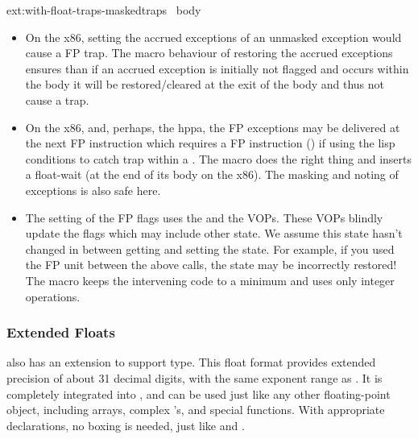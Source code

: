 \begin{defmac}{ext:}{with-float-traps-masked}{traps \ampbody\ body}
\begin{itemize}
  \item On the x86, setting the accrued exceptions of an unmasked
    exception would cause a FP trap. The macro behaviour of restoring
    the accrued exceptions ensures than if an accrued exception is
    initially not flagged and occurs within the body it will be
    restored/cleared at the exit of the body and thus not cause a
    trap.
    
  \item On the x86, and, perhaps, the hppa, the FP exceptions may be
    delivered at the next FP instruction which requires a FP
     instruction () if using the lisp
    conditions to catch trap within a .  The
     macro does the right thing and inserts a
    float-wait (at the end of its body on the x86).  The masking and
    noting of exceptions is also safe here.
    
  \item The setting of the FP flags uses the
     and the  VOPs. These VOPs blindly update
    the flags which may include other state.  We assume this state
    hasn't changed in between getting and setting the state. For
    example, if you used the FP unit between the above calls, the
    state may be incorrectly restored! The
     macro keeps the intervening code to
    a minimum and uses only integer operations.
  \end{itemize}

\end{defmac}

\subsubsection{Extended Floats}

\cmucl{} also has an extension to support 
type.  This float format provides extended precision of about 31
decimal digits, with the same exponent range as .
It is completely integrated into \cmucl{}, and can be used just like
any other floating-point object, including arrays, complex
's, and special functions.  With appropriate
declarations, no boxing is needed, just like  and
. 

